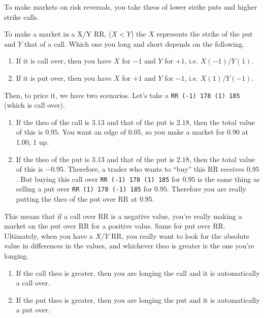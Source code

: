 \documentclass{article}
\begin{document}
    To make markets on risk reversals, you take theos of lower strike puts and higher strike calls. 

    \begin{example}
      \label{ex:rr-market-making}
      To make a market in a X/Y RR, ($X < Y$) the $X$ represents the strike of the put and $Y$ that of a call. Which one you long and short depends on the following. 
      \begin{enumerate}
        \item If it is call over, then you have $X$ for $-1$ and $Y$ for $+1$, i.e. $X (-1) / Y (1)$. 
        \item If it is put over, then you have $X$ for $+1$ and $Y$ for $-1$, i.e. $X (1) / Y (-1)$. 
      \end{enumerate}
      Then, to price it, we have two scenarios. Let's take a \texttt{RR (-1) 178 (1) 185} (which is call over).  
      \begin{enumerate}
        \item If the theo of the call is $3.13$ and that of the put is $2.18$, then the total value of this is $0.95$. You want an edge of $0.05$, so you make a market for 0.90 at 1.00, 1 up. 

        \item If the theo of the put is $3.13$ and that of the put is $2.18$, then the total value of this is $-0.95$. Therefore, a trader who wants to ``buy'' this RR receives $0.95$. But buying this call over \texttt{RR (-1) 178 (1) 185} for $0.95$ is the same thing as selling a put over \texttt{RR (1) 178 (-1) 185} for $0.95$. Therefore you are really putting the theo of the put over RR at $0.95$. 
      \end{enumerate}
    \end{example}

    This means that if a call over RR is a negative value, you're really making a market on the put over RR for a positive value. Same for put over RR. Ultimately, when you have a $X/Y$ RR, you really want to look for the absolute value in differences in the values, and whichever theo is greater is the one you're longing. 
    \begin{enumerate}
      \item If the call theo is greater, then you are longing the call and it is automatically a call over. 
      \item If the put theo is greater, then you are longing the put and it is automatically a put over. 
    \end{enumerate}
\end{document}

